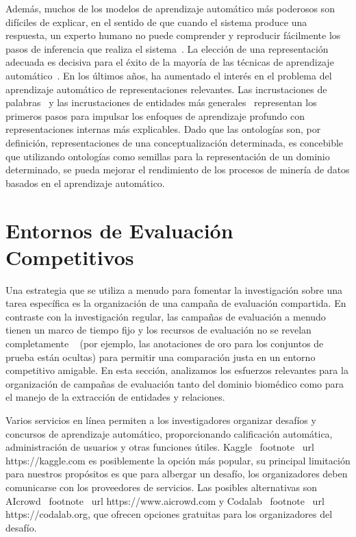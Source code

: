 Además, muchos de los modelos de aprendizaje automático más poderosos son difíciles de explicar, en el sentido de que cuando el sistema produce una respuesta, un experto humano no puede comprender y reproducir fácilmente los pasos de inferencia que realiza el sistema~\cite{olden2002illuminating}. La elección de una representación adecuada es decisiva para el éxito de la mayoría de las técnicas de aprendizaje automático~\cite{bengio2012deep}. En los últimos años, ha aumentado el interés en el problema del aprendizaje automático de representaciones relevantes. Las incrustaciones de palabras~\cite{mikolov} y las incrustaciones de entidades más generales~\cite{hu2015entity} representan los primeros pasos para impulsar los enfoques de aprendizaje profundo con representaciones internas más explicables. Dado que las ontologías son, por definición, representaciones de una conceptualización determinada, es concebible que utilizando ontologías como semillas para la representación de un dominio determinado, se pueda mejorar el rendimiento de los procesos de minería de datos basados ​​en el aprendizaje automático.

\section{Entornos de Evaluación Competitivos}

Una estrategia que se utiliza a menudo para fomentar la investigación sobre una tarea específica es la organización de una campaña de evaluación compartida. En contraste con la investigación regular, las campañas de evaluación a menudo tienen un marco de tiempo fijo y los recursos de evaluación no se revelan completamente ~ (por ejemplo, las anotaciones de oro para los conjuntos de prueba están ocultas) para permitir una comparación justa en un entorno competitivo amigable. En esta sección, analizamos los esfuerzos relevantes para la organización de campañas de evaluación tanto del dominio biomédico como para el manejo de la extracción de entidades y relaciones.

Varios servicios en línea permiten a los investigadores organizar desafíos y concursos de aprendizaje automático, proporcionando calificación automática, administración de usuarios y otras funciones útiles. Kaggle \ footnote {\ url {https://kaggle.com}} es posiblemente la opción más popular, su principal limitación para nuestros propósitos es que para albergar un desafío, los organizadores deben comunicarse con los proveedores de servicios. Las posibles alternativas son AIcrowd \ footnote {\ url {https://www.aicrowd.com}} y Codalab \ footnote {\ url {https://codalab.org}}, que ofrecen opciones gratuitas para los organizadores del desafío.

